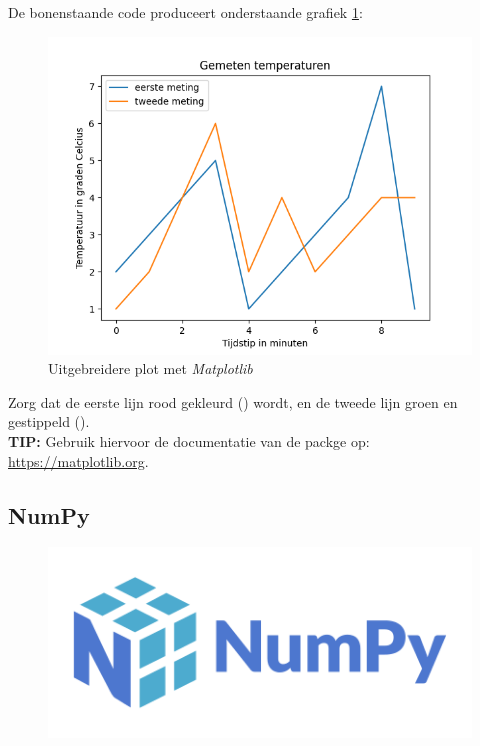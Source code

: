 
De bonenstaande code produceert onderstaande grafiek \ref{fig:plot2}:
\begin{figure}[h!]
\centering\includegraphics[scale=0.7]{Pictures/chapter07/plot2.png}
\caption{Uitgebreidere plot met \textit{Matplotlib}}
\label{fig:plot2} 
\end{figure}

\begin{exercise}
Zorg dat de eerste lijn rood gekleurd () wordt, en de tweede lijn groen en gestippeld (). \\
\textbf{TIP: } Gebruik hiervoor de documentatie van de packge op: \url{https://matplotlib.org}. 
\end{exercise}

\subsection{NumPy}

\begin{figure}[h!]
\centering\includegraphics[scale=0.5]{Pictures/chapter07/numpy_logo.png}
\label{fig:numpylogo} %
\end{figure}

